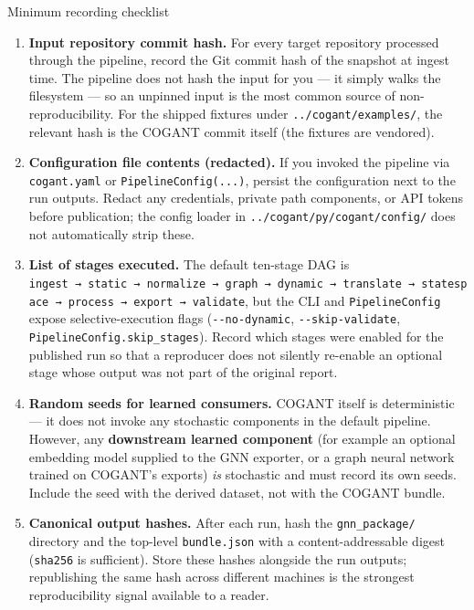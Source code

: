 \documentclass[
  ignorenonframetext,
]{beamer}
\begin{document}
\begin{frame}[fragile]{Minimum recording checklist}
\begin{enumerate}
\item
  \textbf{Input repository commit hash.} For every target repository
  processed through the pipeline, record the Git commit hash of the
  snapshot at ingest time. The pipeline does not hash the input for you
  --- it simply walks the filesystem --- so an unpinned input is the
  most common source of non-reproducibility. For the shipped fixtures
  under \texttt{../cogant/examples/}, the relevant hash is the COGANT
  commit itself (the fixtures are vendored).
\item
  \textbf{Configuration file contents (redacted).} If you invoked the
  pipeline via \texttt{cogant.yaml} or \texttt{PipelineConfig(...)},
  persist the configuration next to the run outputs. Redact any
  credentials, private path components, or API tokens before
  publication; the config loader in \texttt{../cogant/py/cogant/config/}
  does not automatically strip these.
\item
  \textbf{List of stages executed.} The default ten-stage DAG is
  \texttt{ingest\ →\ static\ →\ normalize\ →\ graph\ →\ dynamic\ →\ translate\ →\ statespace\ →\ process\ →\ export\ →\ validate},
  but the CLI and \texttt{PipelineConfig} expose selective-execution
  flags (\texttt{-\/-no-dynamic}, \texttt{-\/-skip-validate},
  \texttt{PipelineConfig.skip\_stages}). Record which stages were
  enabled for the published run so that a reproducer does not silently
  re-enable an optional stage whose output was not part of the original
  report.
\item
  \textbf{Random seeds for learned consumers.} COGANT itself is
  deterministic --- it does not invoke any stochastic components in the
  default pipeline. However, any \textbf{downstream learned component}
  (for example an optional embedding model supplied to the GNN exporter,
  or a graph neural network trained on COGANT's exports) \emph{is}
  stochastic and must record its own seeds. Include the seed with the
  derived dataset, not with the COGANT bundle.
\item
  \textbf{Canonical output hashes.} After each run, hash the
  \texttt{gnn\_package/} directory and the top-level
  \texttt{bundle.json} with a content-addressable digest
  (\texttt{sha256} is sufficient). Store these hashes alongside the run
  outputs; republishing the same hash across different machines is the
  strongest reproducibility signal available to a reader.
\end{enumerate}
\end{frame}
\end{document}
